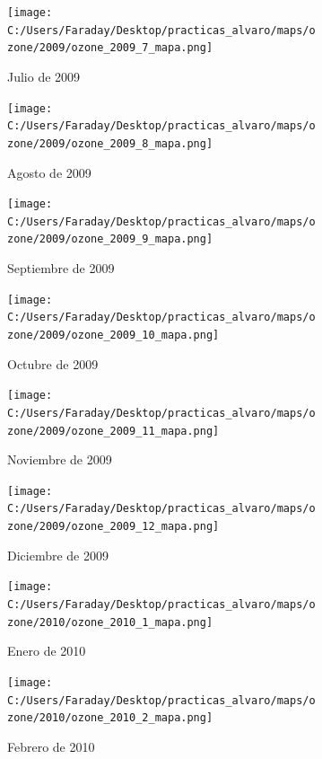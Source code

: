 \documentclass[12pt]{article}
\begin{document}
\newpage

\begin{figure}[H]
\centering
\begin{subfigure}[h]{0.45\textwidth}
\texttt{[image: C:/Users/Faraday/Desktop/practicas\_alvaro/maps/ozone/2009/ozone\_2009\_7\_mapa.png]}
\caption{Julio de 2009}
\label{fig:map-mon-2-7-2009}
\end{subfigure}
%
\begin{subfigure}[H]{0.45\textwidth}
\texttt{[image: C:/Users/Faraday/Desktop/practicas\_alvaro/maps/ozone/2009/ozone\_2009\_8\_mapa.png]}
\caption{Agosto de 2009}
\label{fig:map-mon-2-8-2009}
\end{subfigure}
\caption{}
\end{figure}

\begin{figure}[H]
\centering
\begin{subfigure}[h]{0.45\textwidth}
\texttt{[image: C:/Users/Faraday/Desktop/practicas\_alvaro/maps/ozone/2009/ozone\_2009\_9\_mapa.png]}
\caption{Septiembre de 2009}
\label{fig:map-mon-2-9-2009}
\end{subfigure}
%
\begin{subfigure}[H]{0.45\textwidth}
\texttt{[image: C:/Users/Faraday/Desktop/practicas\_alvaro/maps/ozone/2009/ozone\_2009\_10\_mapa.png]}
\caption{Octubre de 2009}
\label{fig:map-mon-2-10-2009}
\end{subfigure}
\caption{}
\end{figure}

\begin{figure}[H]
\centering
\begin{subfigure}[h]{0.45\textwidth}
\texttt{[image: C:/Users/Faraday/Desktop/practicas\_alvaro/maps/ozone/2009/ozone\_2009\_11\_mapa.png]}
\caption{Noviembre de 2009}
\label{fig:map-mon-2-11-2009}
\end{subfigure}
%
\begin{subfigure}[H]{0.45\textwidth}
\texttt{[image: C:/Users/Faraday/Desktop/practicas\_alvaro/maps/ozone/2009/ozone\_2009\_12\_mapa.png]}
\caption{Diciembre de 2009}
\label{fig:map-mon-2-12-2009}
\end{subfigure}
\caption{}
\end{figure}

\newpage

\begin{figure}[H]
\centering
\begin{subfigure}[h]{0.45\textwidth}
\texttt{[image: C:/Users/Faraday/Desktop/practicas\_alvaro/maps/ozone/2010/ozone\_2010\_1\_mapa.png]}
\caption{Enero de 2010}
\label{fig:map-mon-2-1-2010}
\end{subfigure}
%
\begin{subfigure}[H]{0.45\textwidth}
\texttt{[image: C:/Users/Faraday/Desktop/practicas\_alvaro/maps/ozone/2010/ozone\_2010\_2\_mapa.png]}
\caption{Febrero de 2010}
\label{fig:map-mon-2-2-2010}
\end{subfigure}
\caption{}
\end{figure}
\end{document}
